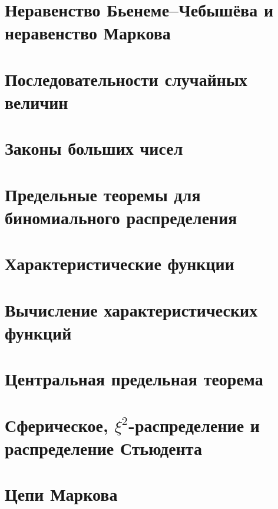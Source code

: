 \section{Неравенство Бьенеме–Чебышёва и
неравенство Маркова}

\section{Последовательности случайных величин}

\section{Законы больших чисел}

\section{Предельные теоремы для
биномиального распределения}

\section{Характеристические функции}

\section{Вычисление характеристических
функций}

\section{Центральная предельная теорема}

\section{Сферическое, $\xi^2$-распределение
и распределение Стьюдента}

\section{Цепи Маркова}









